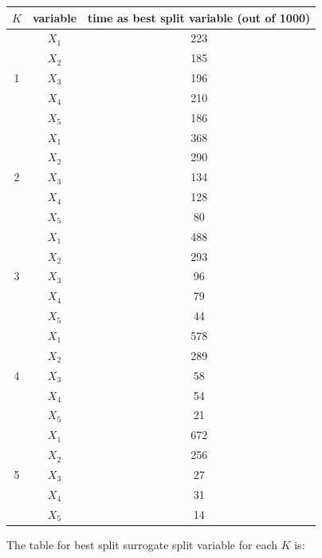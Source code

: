 \documentclass[paper=letter, fontsize=12pt]{article}
\begin{document}
\begin{enumerate}[label=(\alph*)]
\begin{enumerate}[label=(\roman*)]
		\begin{center}
			\begin{longtable}{|c|c|c|}
				\hline
				$K$ & variable & time as best split variable (out of 1000) \\ \hline
				\multirow{5}{1em}{1} & $X_1$ & 223 \\ 
				& $X_2$ & 185 \\
				& $X_3$ & 196 \\
				& $X_4$ & 210 \\
				& $X_5$ & 186 \\
				\hline
				\multirow{5}{1em}{2} & $X_1$ & 368 \\ 
				& $X_2$ & 290 \\
				& $X_3$ & 134 \\
				& $X_4$ & 128 \\
				& $X_5$ & 80 \\
				\hline
				\multirow{5}{1em}{3} & $X_1$ & 488 \\ 
				& $X_2$ & 293 \\
				& $X_3$ & 96 \\
				& $X_4$ & 79 \\
				& $X_5$ & 44 \\
				\hline
				\multirow{5}{1em}{4} & $X_1$ & 578 \\ 
				& $X_2$ & 289 \\
				& $X_3$ & 58 \\
				& $X_4$ & 54 \\
				& $X_5$ & 21 \\
				\hline
				\multirow{5}{1em}{5} & $X_1$ & 672 \\ 
				& $X_2$ & 256 \\
				& $X_3$ & 27 \\
				& $X_4$ & 31 \\
				& $X_5$ & 14 \\
				\hline
			\end{longtable}
		\end{center}	
		
		The table for best split surrogate split variable for each $K$ is:
		

\end{enumerate}
\end{enumerate}
\end{document}
